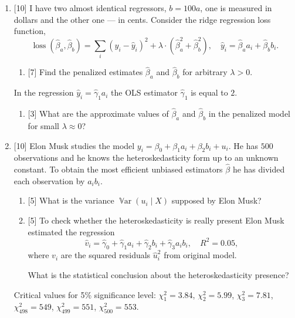 \documentclass[12pt]{article}
\DeclareMathOperator{\Var}{\mathbb{V}ar}
\DeclareMathOperator{\loss}{loss}
\newcommand{\hb}{\hat{\beta}}
\begin{document}
\begin{enumerate}
    \item {[10]} I have two almost identical regressors, $b = 100a$, 
    one is measured in dollars and the other one — in cents. 
    Consider the ridge regression loss function,  
    \[
    \loss(\hb_a, \hb_b) = \sum_i (y_i - \hat y_i)^2 + \lambda \cdot (\hb_a^2 + \hb_b^2), \quad \hat y_i = \hb_a a_i + \hb_b b_i.
    \] 
    \begin{enumerate}
        \item {[7]} Find the penalized estimates $\hb_a$ and $\hb_b$ for arbitrary $\lambda > 0$.
    \end{enumerate}
    In the regression $\hat y_i = \hat\gamma_1 a_i$ the OLS estimator $\hat\gamma_1$ is equal to $2$.
    \begin{enumerate}[resume]
        \item {[3]} What are the approximate values of $\hb_a$ and $\hb_b$ in the penalized model for small $\lambda \approx 0$?
    \end{enumerate}
    
    \item {[10]} Elon Musk studies the model $y_i = \beta_0 + \beta_1 a_i + \beta_2 b_i + u_i$.
    He has $500$ observations and he knows the heteroskedasticity form up to an unknown constant.
    To obtain the most efficient unbiased estimators $\hb$ he has divided each observation by $a_i b_i$. 

    \begin{enumerate}
        \item {[5]} What is the variance $\Var(u_i \mid X)$ supposed by Elon Musk?
        \item {[5]} To check whether the heteroskedasticity is really present Elon Musk estimated the regression 
        \[
        \hat v_i = \hat \gamma_0 + \hat\gamma_1 a_i + \hat\gamma_2 b_i + \hat\gamma_3 a_i b_i, \quad R^2 = 0.05,
        \]
        where $v_i$ are the squared residuals $\hat u_i^2$ from original model. 

       What is the statistical conclusion about the heteroskedasticity presence?
    \end{enumerate}

    Critical values for 5\% significance level: $\chi^2_1 = 3.84$, $\chi^2_2= 5.99$, $\chi^2_3=7.81$, $\chi^2_{498} = 549$, $\chi^2_{499} = 551$, $\chi^2_{500} = 553$.



\end{enumerate}
\end{document}
